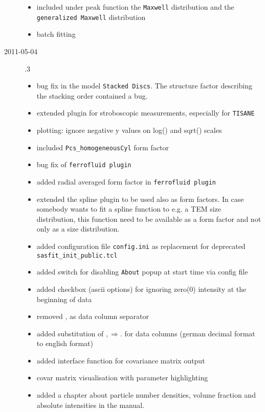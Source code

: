 \begin{description}
\begin{itemize}
      \item included under peak function the \texttt{Maxwell} distribution and the
            \texttt{generalized Maxwell} distribution
      \item batch fitting
    \end{itemize}
    \item[2011-05-04] .3
        \begin{itemize}
        \item  bug fix in the model \texttt{Stacked Discs}. The structure factor describing the
            stacking order contained a bug.
        \item extended plugin for stroboscopic measurements, especially for \texttt{TISANE}
        \item plotting: ignore negative y values on log() and sqrt() scales
        \item included \texttt{Pcs\_homogeneousCyl} form factor
        \item bug fix of \texttt{ferrofluid plugin}
        \item added radial averaged form factor in \texttt{ferrofluid plugin}
        \item extended the spline plugin to be used also as form factors.
            In case somebody wants to fit a spline function to e.g. a TEM size distribution,
            this function need to be available as a form factor and not only as a size
            distribution.
        \item added configuration file \texttt{config.ini} as replacement for
            deprecated \texttt{sasfit\_init\_public.tcl}
        \item added switch for disabling \texttt{About} popup at start time via config file
        \item added checkbox (ascii options) for ignoring zero(0) intensity at the beginning
                of data
        \item removed , as data column separator
        \item added substitution of $, \Rightarrow .$   for data columns
                (german decimal format to english format)
        \item added interface function for covariance matrix output
        \item covar matrix visualisation with parameter highlighting
        \item added a chapter about particle number densities, volume fraction
            and absolute intensities in the manual.

\end{itemize}
\end{description}
